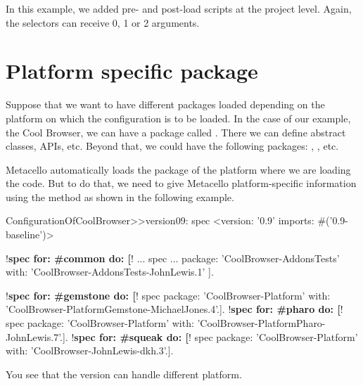 \documentclass[a4paper,10pt,twoside]{book}
\begin{document}
In this example, we added pre- and post-load scripts at the project level. Again, the selectors can receive 0, 1 or 2 arguments. 


\section {Platform specific package}

Suppose that we want to have different packages loaded depending on the platform on which the configuration is to be loaded. In the case of our example, the Cool Browser, we can have a package called . There we can define abstract classes, APIs, etc. Beyond that, we could have the following packages: , , etc.

Metacello automatically loads the package of the platform where we are loading the code. But to do that, we need to give Metacello  platform-specific information using the method  as shown in the following example.

\begin{code}{} 
ConfigurationOfCoolBrowser>>version09: spec 
	<version: '0.9' imports: #('0.9-baseline')>
	
	!\textbf{spec for: \#common do: [}!
		...
		spec 
	          ...
			package: 'CoolBrowser-AddonsTests' with: 'CoolBrowser-AddonsTests-JohnLewis.1' ].
	
	!\textbf{spec for: \#gemstone do: [}!
		spec package: 'CoolBrowser-Platform' with: 'CoolBrowser-PlatformGemstone-MichaelJones.4'.].
	!\textbf{spec for: \#pharo do: [}!
		spec package: 'CoolBrowser-Platform' with: 'CoolBrowser-PlatformPharo-JohnLewis.7'.].
	!\textbf{spec for: \#squeak do: [}!
		spec package: 'CoolBrowser-Platform' with: 'CoolBrowser-JohnLewis-dkh.3'.].
\end{code}

You see that the version can handle different platform.
\end{document}
